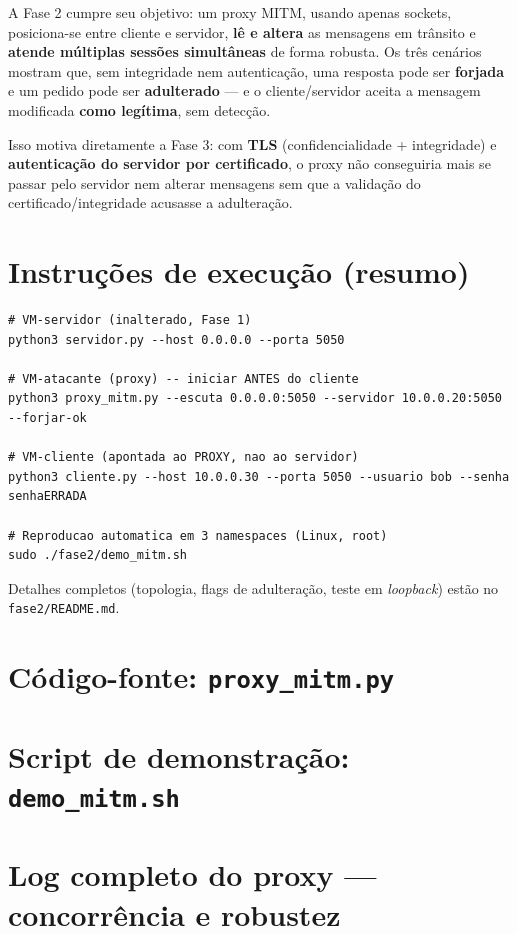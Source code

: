 \documentclass[11pt,a4paper]{article}
\begin{document}
A Fase 2 cumpre seu objetivo: um proxy MITM, usando apenas sockets, posiciona-se
entre cliente e servidor, \textbf{lê e altera} as mensagens em trânsito e
\textbf{atende múltiplas sessões simultâneas} de forma robusta. Os três cenários
mostram que, sem integridade nem autenticação, uma resposta pode ser
\textbf{forjada} e um pedido pode ser \textbf{adulterado} — e o cliente/servidor
aceita a mensagem modificada \textbf{como legítima}, sem detecção.

Isso motiva diretamente a Fase 3: com \textbf{TLS} (confidencialidade +
integridade) e \textbf{autenticação do servidor por certificado}, o proxy não
conseguiria mais se passar pelo servidor nem alterar mensagens sem que a
validação do certificado/integridade acusasse a adulteração.

\appendix
\newpage
\section{Instruções de execução (resumo)}
\label{ap:exec}

\begin{lstlisting}[style=saida]
# VM-servidor (inalterado, Fase 1)
python3 servidor.py --host 0.0.0.0 --porta 5050

# VM-atacante (proxy) -- iniciar ANTES do cliente
python3 proxy_mitm.py --escuta 0.0.0.0:5050 --servidor 10.0.0.20:5050 --forjar-ok

# VM-cliente (apontada ao PROXY, nao ao servidor)
python3 cliente.py --host 10.0.0.30 --porta 5050 --usuario bob --senha senhaERRADA

# Reproducao automatica em 3 namespaces (Linux, root)
sudo ./fase2/demo_mitm.sh
\end{lstlisting}

Detalhes completos (topologia, flags de adulteração, teste em \textit{loopback})
estão no \texttt{fase2/README.md}.

\newpage
\section{Código-fonte: \texttt{proxy\_mitm.py}}
\label{ap:codigo}


\newpage
\section{Script de demonstração: \texttt{demo\_mitm.sh}}
\label{ap:demo}


\newpage
\section{Log completo do proxy — concorrência e robustez}
\label{ap:concorrencia}

\end{document}
